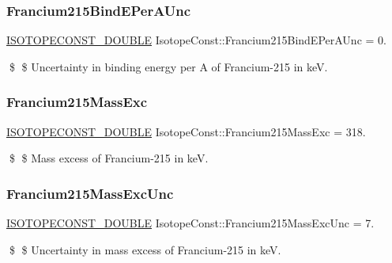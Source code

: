 \subsubsection{\texorpdfstring{Francium215\+Bind\+E\+Per\+A\+Unc}{Francium215BindEPerAUnc}}
{\footnotesize\ttfamily \mbox{\hyperlink{group___isotope_const-_macros_ga8f45a7272ce02c0b4c65c44636ed719a}{I\+S\+O\+T\+O\+P\+E\+C\+O\+N\+S\+T\+\_\+\+D\+O\+U\+B\+LE}} Isotope\+Const\+::\+Francium215\+Bind\+E\+Per\+A\+Unc = 0.}

\$ \$ Uncertainty in binding energy per A of Francium-\/215 in keV. \mbox{\label{group___isotope_const-_francium-_fr215_gaf698337aea65d988da42f7cc55c5c5d5}} 
\subsubsection{\texorpdfstring{Francium215\+Mass\+Exc}{Francium215MassExc}}
{\footnotesize\ttfamily \mbox{\hyperlink{group___isotope_const-_macros_ga8f45a7272ce02c0b4c65c44636ed719a}{I\+S\+O\+T\+O\+P\+E\+C\+O\+N\+S\+T\+\_\+\+D\+O\+U\+B\+LE}} Isotope\+Const\+::\+Francium215\+Mass\+Exc = 318.}

\$ \$ Mass excess of Francium-\/215 in keV. \mbox{\label{group___isotope_const-_francium-_fr215_gaf25e51f7a1ca37410dbbac133e9f99bb}} 
\subsubsection{\texorpdfstring{Francium215\+Mass\+Exc\+Unc}{Francium215MassExcUnc}}
{\footnotesize\ttfamily \mbox{\hyperlink{group___isotope_const-_macros_ga8f45a7272ce02c0b4c65c44636ed719a}{I\+S\+O\+T\+O\+P\+E\+C\+O\+N\+S\+T\+\_\+\+D\+O\+U\+B\+LE}} Isotope\+Const\+::\+Francium215\+Mass\+Exc\+Unc = 7.}

\$ \$ Uncertainty in mass excess of Francium-\/215 in keV. \mbox{\label{group___isotope_const-_francium-_fr215_ga948273d54866957ab5cbe3caffcaa257}} 
